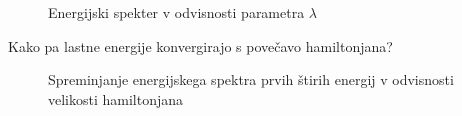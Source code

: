 \begin{figure}[h]
    \centering
    \caption{Energijski spekter v odvisnosti parametra $\lambda$}
\end{figure}
\newpage
Kako pa lastne energije konvergirajo s povečavo hamiltonjana?
\begin{figure}[h]
    \begin{center}
    \end{center}
    \caption{Spreminjanje energijskega spektra prvih štirih energij v odvisnosti velikosti hamiltonjana}
\end{figure}
